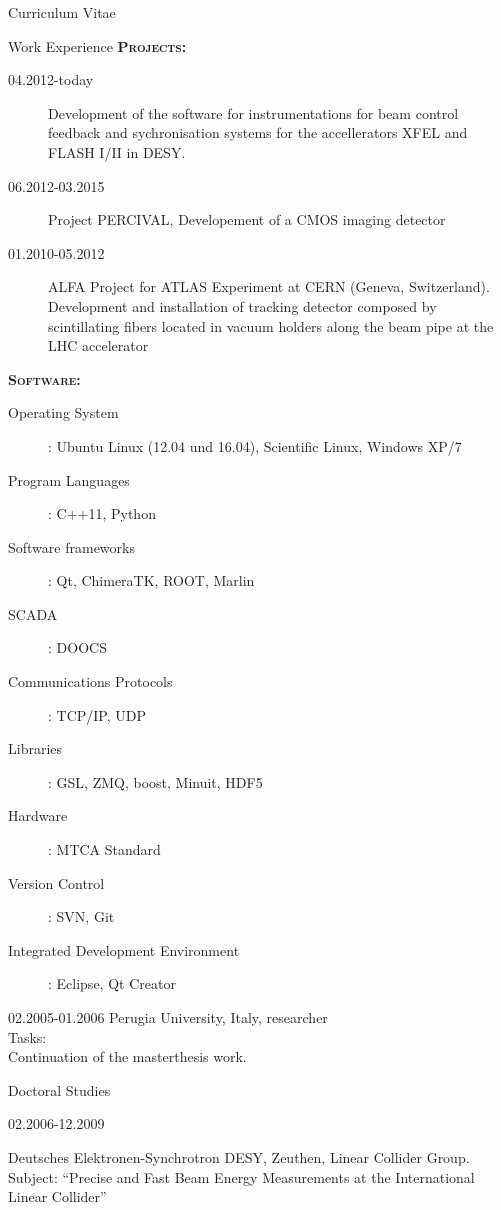 \documentclass[11pt,a4paper]{scrartcl}
\begin{document}
\begin{cv}{Curriculum Vitae}
\begin{cvlist}{Work Experience}
{\scshape {\bfseries Projects:}}
\begin{description}
\item[04.2012-today] Development of the software for instrumentations for beam
control feedback and sychronisation systems for the accellerators XFEL and FLASH I/II in
DESY.
\item[06.2012-03.2015]Project PERCIVAL, Developement of a CMOS imaging
detector
\item[01.2010-05.2012]ALFA Project for ATLAS Experiment at CERN (Geneva,
Switzerland). Development and installation of tracking detector composed by
scintillating fibers  located in vacuum holders along the beam pipe at the LHC
accelerator
\end{description}
{\scshape {\bfseries Software:}}
\begin{description}
\item[Operating System] : Ubuntu Linux (12.04 und 16.04), Scientific Linux,
Windows XP/7
\item[Program Languages] : C++11, Python
\item[Software frameworks] : Qt, ChimeraTK, ROOT, Marlin
\item[SCADA] : DOOCS
\item[Communications Protocols] : TCP/IP, UDP
\item[Libraries] : GSL, ZMQ, boost, Minuit, HDF5
\item[Hardware] : MTCA Standard
\item[Version Control] : SVN, Git
\item[Integrated Development Environment] : Eclipse, Qt Creator
\end{description}

\vspace{\baselineskip}

\item[02.2005-01.2006] Perugia
University, Italy, researcher \\

Tasks:\\

Continuation of the masterthesis work.

\end{cvlist}

\begin{cvlist}{Doctoral Studies}
\item[02.2006-12.2009]

Deutsches Elektronen-Synchrotron DESY, Zeuthen, Linear Collider
Group.\\ Subject:
"`Precise and Fast Beam Energy Measurements at the International
Linear Collider"'


\end{cvlist}
\end{cv}
\end{document}
